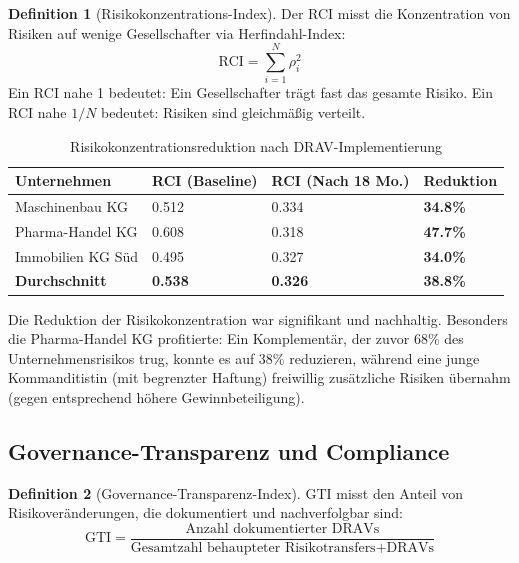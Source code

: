 \documentclass[a4paper,12pt]{article}
\theoremstyle{definition}
\newtheorem{definition}{Definition}
\begin{document}
\begin{definition}[Risikokonzentrations-Index]
Der RCI misst die Konzentration von Risiken auf wenige Gesellschafter via Herfindahl-Index:
\begin{equation}
\text{RCI} = \sum_{i=1}^N \rho_i^2
\end{equation}
Ein RCI nahe 1 bedeutet: Ein Gesellschafter trägt fast das gesamte Risiko. Ein RCI nahe $1/N$ bedeutet: Risiken sind gleichmäßig verteilt.
\end{definition}

\begin{table}[H]
\centering
\caption{Risikokonzentrationsreduktion nach DRAV-Implementierung}
\label{tab:rci_results}
\begin{tabular}{@{}llll@{}}
\toprule
\textbf{Unternehmen} & \textbf{RCI (Baseline)} & \textbf{RCI (Nach 18 Mo.)} & \textbf{Reduktion} \\
\midrule
Maschinenbau KG & 0.512 & 0.334 & \textbf{34.8\%} \\
Pharma-Handel KG & 0.608 & 0.318 & \textbf{47.7\%} \\
Immobilien KG Süd & 0.495 & 0.327 & \textbf{34.0\%} \\
\midrule
\textbf{Durchschnitt} & \textbf{0.538} & \textbf{0.326} & \textbf{38.8\%} \\
\bottomrule
\end{tabular}
\end{table}

Die Reduktion der Risikokonzentration war signifikant und nachhaltig. Besonders die Pharma-Handel KG profitierte: Ein Komplementär, der zuvor 68\% des Unternehmensrisikos trug, konnte es auf 38\% reduzieren, während eine junge Kommanditistin (mit begrenzter Haftung) freiwillig zusätzliche Risiken übernahm (gegen entsprechend höhere Gewinnbeteiligung).

\subsection{Governance-Transparenz und Compliance}

\begin{definition}[Governance-Transparenz-Index]
GTI misst den Anteil von Risikoveränderungen, die dokumentiert und nachverfolgbar sind:
\begin{equation}
\text{GTI} = \frac{\text{Anzahl dokumentierter DRAVs}}{\text{Gesamtzahl behaupteter Risikotransfers} + \text{DRAVs}}
\end{equation}
\end{definition}
\end{document}
